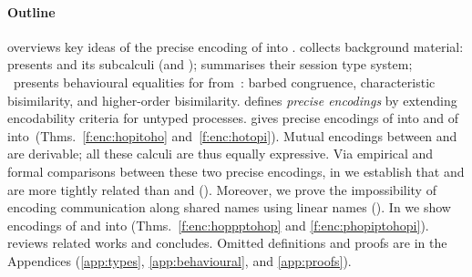 \documentclass[preprint,11pt]{elsarticle}
\begin{document}
{\paragraph{Outline} 
 overviews key ideas of the precise encoding of \HOp into \sessp.
{} 
collects background material:
presents \HOp and its 
subcalculi (\HO and \sessp); %
 summarises their session type system;
~pres\-ents  behavioural equalities for \HOp from~\cite{characteristic_bis,KouzapasPY17}:
barbed congruence, characteristic bisimilarity, 
and higher-order bisimilarity.
 defines \emph{precise %
encodings} by extending encodability criteria  for untyped processes. %
{} %
gives {precise encodings} of \HOp into \HO and of \HOp into~\sessp (Thms.~\ref{f:enc:hopitoho} and~\ref{f:enc:hotopi}).
Mutual encodings between \sessp and \HO are derivable; 
all these calculi are thus equally expressive.
Via
empirical and formal comparisons between these two precise encodings, in  we establish that
\HOp and \HO are more tightly related than \HOp and \sessp ().
Moreover, we prove the impossibility of encoding communication along shared names
using linear names ().
In  %
we show 
encodings of \HOpp and \PHOp 
into \HOp
(Thms.~\ref{f:enc:hoppptohop} and \ref{f:enc:phopiptohopi}).
{} reviews related works and 
 concludes.
{Omitted definitions and  proofs are in the Appendices (\ref{app:types}, \ref{app:behavioural}, and \ref{app:proofs}).
} 

}
\end{document}
